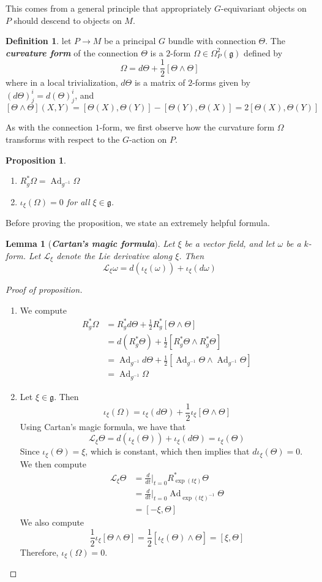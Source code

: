 \documentclass[psamsfonts, 12pt]{amsart}
\newtheorem{prop}[thm]{Proposition}
\newtheorem{lem}[thm]{Lemma}
\theoremstyle{definition}
\newtheorem{defn}[thm]{Definition}
\theoremstyle{remark}
\newcommand{\ib}[1]{\textbf{\textit{#1}}}
\newcommand{\g}{\mathfrak{g}}
\newcommand{\inv}{^{-1}}
\newcommand{\enumbreak}{\ \\ \vspace{-\baselineskip}}
\DeclareMathOperator{\Ad}{Ad}
\begin{document}
%
This comes from a general principle that appropriately $G$-equivariant objects
on $P$ should descend to objects on $M$.
%
\begin{defn}
let $P \to M$ be a principal $G$ bundle with connection $\Theta$. The \ib{curvature form}
of the connection $\Theta$ is a $2$-form $\Omega \in \Omega^2_P(\g)$ defined by
\[
\Omega = d\Theta + \frac{1}{2}[\Theta \wedge \Theta]
\]
where in a local trivialization, $d\Theta$ is a matrix of $2$-forms given by
$(d\Theta)^i_j = d(\Theta)^i_j$, and
\[
[\Theta \wedge \Theta](X,Y) = [\Theta(X),\Theta(Y)] - [\Theta(Y), \Theta(X)] =
2[\Theta(X), \Theta(Y)]
\]
\end{defn}
%
As with the connection $1$-form, we first observe how the curvature form $\Omega$
transforms with respect to the $G$-action on $P$.
%
\begin{prop} \enumbreak
\begin{enumerate}
  \item $R_g^*\Omega = \Ad_{g\inv}\Omega$
  \item $\iota_\xi(\Omega) = 0$ for all $\xi \in \g$.
\end{enumerate}
\end{prop}
%
Before proving the proposition, we state an extremely helpful formula.
%
\begin{lem}[\ib{Cartan's magic formula}]
Let $\xi$ be a vector field, and let $\omega$ be a $k$-form. Let $\mathcal{L}_\xi$
denote the Lie derivative along $\xi$. Then
\[
\mathcal{L}_\xi\omega = d(\iota_\xi(\omega)) + \iota_\xi(d\omega)
\]
\end{lem}
%
\begin{proof}[Proof of proposition] \enumbreak
\begin{enumerate}
  \item We compute
  \begin{align*}
  R_g^*\Omega &= R_g^*d\Theta + \frac{1}{2}R_g^*[\Theta \wedge \Theta] \\
  &= d(R_g^*\Theta) + \frac{1}{2}[R_g^*\Theta\wedge R_g^*\Theta] \\
  &= \Ad_{g\inv}d\Theta + \frac{1}{2}[\Ad_{g\inv}\Theta \wedge \Ad_{g\inv}\Theta] \\
  & = \Ad_{g\inv}\Omega
  \end{align*}
  \item Let $\xi \in \g$. Then
  \[
  \iota_{\xi}(\Omega) = \iota_\xi(d\Theta) + \frac{1}{2}\iota_\xi[\Theta \wedge \Theta]
  \]
  Using Cartan's magic formula, we have that
  \[
  \mathcal{L}_\xi\Theta = d(\iota_\xi(\Theta)) + \iota_\xi(d\Theta) = \iota_\xi(\Theta)
  \]
  Since $\iota_\xi(\Theta) = \xi$, which is constant, which then implies that
  $d\iota_\xi(\Theta) = 0$. We then compute
  \begin{align*}
  \mathcal{L}_\xi\Theta &= \frac{d}{dt}\bigg\vert_{t=0}R^*_{\exp(t\xi)}\Theta \\
  &= \frac{d}{dt}\bigg\vert_{t=0}\Ad_{\exp(t\xi)\inv}\Theta \\
  &= [-\xi,\Theta]
  \end{align*}
  We also compute
  \[
  \frac{1}{2}\iota_\xi[\Theta\wedge\Theta] = \frac{1}{2}[\iota_\xi(\Theta) \wedge \Theta]
  = [\xi,\Theta]
  \]
  Therefore, $\iota_\xi(\Omega) = 0$.
\end{enumerate}
\end{proof}
\end{document}
